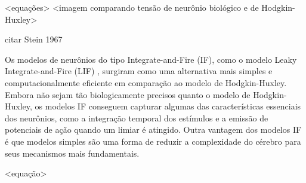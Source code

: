 <equações>
<imagem comparando tensão de neurônio biológico e de Hodgkin-Huxley>

citar Stein 1967

Os modelos de neurônios do tipo Integrate-and-Fire (IF), como o modelo Leaky Integrate-and-Fire (LIF) \cite{burkitt2006review},
surgiram como uma alternativa mais simples e computacionalmente eficiente em comparação ao modelo de Hodgkin-Huxley. Embora não
sejam tão biologicamente precisos quanto o modelo de Hodgkin-Huxley, os modelos IF conseguem capturar algumas das características
essenciais dos neurônios, como a integração temporal dos estímulos e a emissão de potenciais de ação quando um limiar é atingido.
Outra vantagem dos modelos IF é que modelos simples são uma forma de reduzir a complexidade do cérebro para seus mecanismos mais
fundamentais.

<equação>